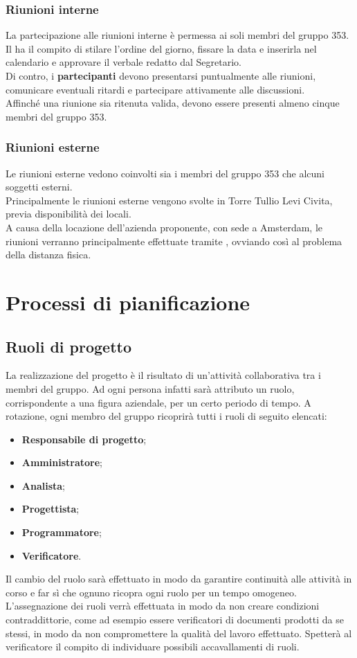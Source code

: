 \documentclass[NormeDiProgetto.tex]{subfiles}
\begin{document}
	\subsubsection{Riunioni interne}
	La partecipazione alle riunioni interne è permessa ai soli membri del gruppo 353.
	Il \respdiprog{} ha il compito di stilare l'ordine del giorno, fissare la data e inserirla nel calendario e approvare il verbale redatto dal Segretario.\\
	Di contro, i \textbf{partecipanti} devono presentarsi puntualmente alle riunioni, comunicare eventuali ritardi e partecipare attivamente alle discussioni.\\
	Affinché una riunione sia ritenuta valida, devono essere presenti almeno cinque membri del gruppo 353.
	\subsubsection{Riunioni esterne}
	Le riunioni esterne vedono coinvolti sia i membri del gruppo 353 che alcuni soggetti esterni.\\
	Principalmente le riunioni esterne vengono svolte in Torre Tullio Levi Civita, previa disponibilità dei locali.\\
	A causa della locazione dell'azienda proponente, con sede a Amsterdam, le riunioni verranno principalmente effettuate tramite , ovviando così al problema della distanza fisica.
	
	\section{Processi di pianificazione}
	\subsection{Ruoli di progetto}
	La realizzazione del progetto è il risultato di un'attività collaborativa tra i membri del gruppo. Ad ogni persona infatti sarà attributo un ruolo, corrispondente a una figura aziendale, per un certo periodo di tempo. A rotazione, ogni membro del gruppo ricoprirà tutti i ruoli di seguito elencati:
	\begin{itemize}
		\item \textbf{Responsabile di progetto};
		\item \textbf{Amministratore};
		\item \textbf{Analista};
		\item \textbf{Progettista};
		\item \textbf{Programmatore};
		\item \textbf{Verificatore}.
	\end{itemize}
	Il cambio del ruolo sarà effettuato in modo da garantire continuità alle attività in corso e far sì che ognuno ricopra ogni ruolo per un tempo omogeneo.\\ L'assegnazione dei ruoli verrà effettuata in modo da non creare condizioni contraddittorie, come ad esempio essere verificatori di documenti prodotti da se stessi, in modo da non compromettere la qualità del lavoro effettuato.
	Spetterà al verificatore il compito di individuare possibili accavallamenti di ruoli. %
\end{document}
